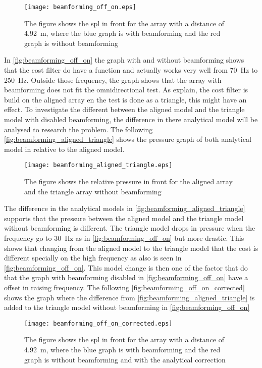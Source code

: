   \begin{figure}[H]
	\centering
	\texttt{[image: beamforming\_off\_on.eps]}
	\caption{The figure shows the \gls{spl} in front for the array with a distance of \SI{4.92}{\meter}, where the blue graph is with beamforming and the red graph is without beamforming}
		\label{fig:beamforming_off_on}
\end{figure}


In \autoref{fig:beamforming_off_on} the graph with and without beamforming shows that the cost filter do have a function and actually works very well from \SI{70}{\hertz} to \SI{250}{\hertz}. Outside those frequency, the graph shows that the array with beamforming does not fit the omnidirectional test. As explain, the cost filter is build on the aligned array en the test is done as a triangle, this might have an effect. To investigate the different between the aligned model and the triangle model with disabled beamforming, the difference in there analytical model will be analysed to research the problem. The following \autoref{fig:beamforming_aligned_triangle} shows the pressure graph of both analytical model in relative to the aligned model.

  \begin{figure}[H]
	\centering
	\texttt{[image: beamforming\_aligned\_triangle.eps]}
	\caption{The figure shows the relative pressure in front for the aligned array and the triangle array without beamforming}
		\label{fig:beamforming_aligned_triangle}
\end{figure}

The difference in the analytical models in \autoref{fig:beamforming_aligned_triangle} supports that the pressure between the aligned model and the triangle model without beamforming is different. The triangle model drops in pressure when the frequency go to \SI{30}{\hertz} as in \autoref{fig:beamforming_off_on} but more drastic. This shows that changing from the aligned model to the triangle model that the cost is different specially on the high frequency as also is seen in \autoref{fig:beamforming_off_on}. This model change is then one of the factor that do that the graph with beamforming disabled in \autoref{fig:beamforming_off_on} have a offset in raising frequency. The following \autoref{fig:beamforming_off_on_corrected} shows the graph where the difference from \autoref{fig:beamforming_aligned_triangle} is added to the triangle model without beamforming in  \autoref{fig:beamforming_off_on}

  \begin{figure}[H]
	\centering
	\texttt{[image: beamforming\_off\_on\_corrected.eps]}
	\caption{The figure shows the \gls{spl} in front for the array with a distance of \SI{4.92}{\meter}, where the blue graph is with beamforming and the red graph is without beamforming and with the analytical correction}
		\label{fig:beamforming_off_on_corrected}
\end{figure}

